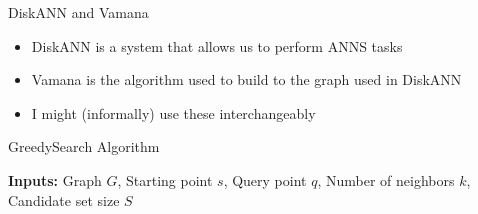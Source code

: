 \documentclass{beamer}
\begin{document}
\begin{frame}{DiskANN and Vamana}
    \begin{itemize}
        \item DiskANN is a system that allows us to perform ANNS tasks
        \item Vamana is the algorithm used to build to the graph used in DiskANN
        \item I might (informally) use these interchangeably
    \end{itemize}
\end{frame}

\begin{frame}
\begin{algorithm}[H]
    \caption{GreedySearch Algorithm}\label{alg:greedy-search}
    \begin{algorithmic}[1]
                \EndIf
            \EndWhile
        \EndFunction
    \end{algorithmic}
\end{algorithm}

\textbf{Inputs:} Graph \(G\), Starting point \(s\), Query point \(q\), Number of neighbors \(k\), Candidate set size \(S\)
\end{frame}
\end{document}

